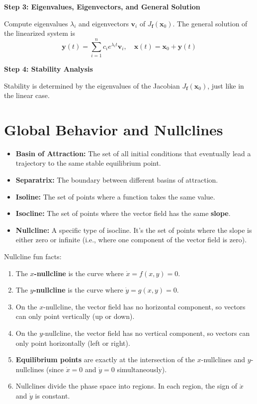 \documentclass{report}
\begin{document}
\textbf{Step 3: Eigenvalues, Eigenvectors, and General Solution}

Compute eigenvalues $\lambda_i$ and eigenvectors $\mathbf{v}_i$ of $J_{\mathbf{f}}(\mathbf{x}_0)$.  
The general solution of the linearized system is
\[
\mathbf{y}(t) = \sum_{i=1}^n c_i e^{\lambda_i t} \mathbf{v}_i, \quad
\mathbf{x}(t) = \mathbf{x}_0 + \mathbf{y}(t)
\]

\textbf{Step 4: Stability Analysis}

Stability is determined by the eigenvalues of the Jacobian $J_{\mathbf{f}}(\mathbf{x}_0)$, just like in the linear case.

\section*{Global Behavior and Nullclines}

\begin{itemize}
  \item \textbf{Basin of Attraction:} The set of all initial conditions that eventually lead a trajectory to the same stable equilibrium point.
  \item \textbf{Separatrix:} The boundary between different basins of attraction.
  \item \textbf{Isoline:} The set of points where a function takes the same value.
  \item \textbf{Isocline:} The set of points where the vector field has the same \textbf{slope}.
  \item \textbf{Nullcline:} A specific type of isocline. It's the set of points where the slope is either zero or infinite (i.e., where one component of the vector field is zero).
\end{itemize}

Nullcline fun facts:
\begin{enumerate}
  \item The \textbf{$x$-nullcline} is the curve where $\dot{x} = f(x,y) = 0$.
  \item The \textbf{$y$-nullcline} is the curve where $\dot{y} = g(x,y) = 0$.
  \item On the $x$-nullcline, the vector field has no horizontal component, so vectors can only point vertically (up or down).
  \item On the $y$-nullcline, the vector field has no vertical component, so vectors can only point horizontally (left or right).
  \item \textbf{Equilibrium points} are exactly at the intersection of the $x$-nullclines and $y$-nullclines (since $\dot{x}=0$ and $\dot{y}=0$ simultaneously).
  \item Nullclines divide the phase space into regions. In each region, the sign of $\dot{x}$ and $\dot{y}$ is constant.
\end{enumerate}
\end{document}
